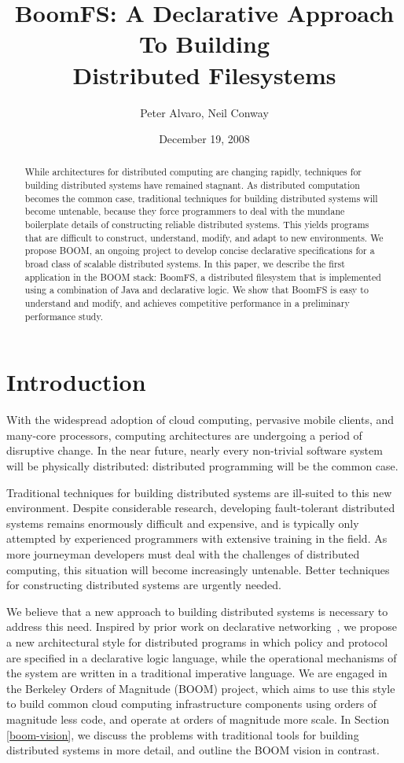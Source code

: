 \documentclass{article}
\title{BoomFS: A Declarative Approach To Building\\Distributed Filesystems}
\author{Peter Alvaro, Neil Conway}
\date{December 19, 2008}
\begin{document}
\maketitle
\begin{abstract}
  While architectures for distributed computing are changing rapidly,
  techniques for building distributed systems have remained
  stagnant. As distributed computation becomes the common case,
  traditional techniques for building distributed systems will become
  untenable, because they force programmers to deal with the mundane
  boilerplate details of constructing reliable distributed
  systems. This yields programs that are difficult to construct,
  understand, modify, and adapt to new environments. We propose BOOM,
  an ongoing project to develop concise declarative specifications for
  a broad class of scalable distributed systems. In this paper, we
  describe the first application in the BOOM stack: BoomFS, a
  distributed filesystem that is implemented using a combination of
  Java and declarative logic. We show that BoomFS is easy to
  understand and modify, and achieves competitive performance in a
  preliminary performance study.
\end{abstract}
\section{Introduction}
\label{introduction}
With the widespread adoption of cloud computing, pervasive mobile
clients, and many-core processors, computing architectures are
undergoing a period of disruptive change. In the near future, nearly
every non-trivial software system will be physically distributed:
distributed programming will be the common case.

Traditional techniques for building distributed systems are ill-suited
to this new environment. Despite considerable research, developing
fault-tolerant distributed systems remains enormously difficult and
expensive, and is typically only attempted by experienced programmers
with extensive training in the field. As more journeyman developers
must deal with the challenges of distributed computing, this situation
will become increasingly untenable. Better techniques for constructing
distributed systems are urgently needed.

We believe that a new approach to building distributed systems is
necessary to address this need. Inspired by prior work on declarative
networking~\cite{dn-sigmod, network-data-indep}, we propose a new
architectural style for distributed programs in which policy and
protocol are specified in a declarative logic language, while the
operational mechanisms of the system are written in a traditional
imperative language. We are engaged in the Berkeley Orders of
Magnitude (BOOM) project, which aims to use this style to build common
cloud computing infrastructure components using orders of magnitude
less code, and operate at orders of magnitude more scale. In Section
\ref{boom-vision}, we discuss the problems with traditional tools for
building distributed systems in more detail, and outline the BOOM
vision in contrast.
\end{document}
